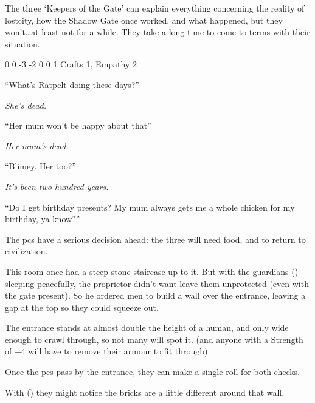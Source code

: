 The three `Keepers of the Gate' can explain everything concerning the reality of \gls{lostcity}, how the Shadow Gate once worked, and what happened, but they won't\ldots at least not for a while.
They take a long time to come to terms with their situation.

\setcounter{Intelligence}{-2}
{0}%
{0}%
{{-3}%
{-2}%
{0}}%
{0}%
{1}%
{Crafts 1, Empathy 2}%
{\Dagger}%
{}

\begin{speechtext}
  ``What's Ratpelt doing these days?''

  \textit{\raggedleft{} She's dead.}

  ``Her mum won't be happy about that''

  \textit{\raggedleft{} Her mum's dead.}

  ``Blimey. Her too?''

  \textit{\raggedleft{} It's been two \underline{hundred} years.}

  ``Do I get birthday presents?
  My mum always gets me a whole chicken for my birthday, ya know?''
\end{speechtext}

The \glspl{pc} have a serious decision ahead: the three will need food, and to return to civilization.


\begin{exampletext}
  This room once had a steep stone staircase up to it.
  But with the guardians () sleeping peacefully, the proprietor didn't want leave them unprotected (even with the gate present).
  So he ordered men to build a wall over the entrance, leaving a gap at the top so they could squeeze out.
\end{exampletext}

The entrance stands at almost double the height of a human, and only wide enough to crawl through, so not many will spot it.
(and anyone with a Strength of +4 will have to remove their armour to fit through)

Once the \glspl{pc} pass by the entrance, they can make a single roll for both checks.

With  (\tn[14]) they might notice the bricks are a little different around that wall.

